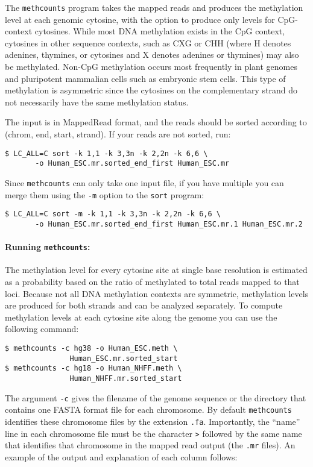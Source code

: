 \documentclass[10pt]{article}
\newcommand{\prog}[1]{\texttt{#1}}
\newcommand{\fn}[1]{\texttt{#1}}
\newcommand{\lit}[1]{\texttt{#1}}
\newcommand{\op}[1]{\texttt{#1}}
\begin{document}
The \prog{methcounts} program takes the mapped reads and produces the
methylation level at each genomic cytosine, with the option to produce
only levels for CpG-context cytosines.
While most DNA methylation exists in the CpG context, cytosines in
other sequence contexts, such as CXG or CHH (where H denotes adenines,
thymines, or cytosines and X denotes adenines or thymines) may also be
methylated. Non-CpG methylation occurs most frequently in plant genomes 
and pluripotent mammalian cells such as embryonic stem cells. This type
of methylation is asymmetric since the cytosines on the complementary 
strand do not necessarily have the same methylation status.

The input is in MappedRead format, and the reads should be sorted
according to (chrom, end, start, strand). If your reads are not
sorted, run:
\begin{verbatim}
$ LC_ALL=C sort -k 1,1 -k 3,3n -k 2,2n -k 6,6 \
       -o Human_ESC.mr.sorted_end_first Human_ESC.mr
\end{verbatim}

Since \prog{methcounts} can only take one input file, if you have
multiple you can merge them using the \op{-m} option to the
\prog{sort} program:

\begin{verbatim}
$ LC_ALL=C sort -m -k 1,1 -k 3,3n -k 2,2n -k 6,6 \
       -o Human_ESC.mr.sorted_end_first Human_ESC.mr.1 Human_ESC.mr.2
\end{verbatim}

\paragraph{Running \prog{methcounts}:}
The methylation level for every cytosine site at single base resolution
is estimated as a probability based on the ratio of methylated to total
reads mapped to that loci. Because not all DNA methylation contexts are
symmetric, methylation levels are produced for both strands and can be
analyzed separately. To compute methylation levels at each
cytosine site along the genome you can use the following command:

\begin{verbatim}
$ methcounts -c hg38 -o Human_ESC.meth \
               Human_ESC.mr.sorted_start
$ methcounts -c hg18 -o Human_NHFF.meth \
               Human_NHFF.mr.sorted_start
\end{verbatim}

The argument \op{-c} gives the filename of the genome sequence or the
directory that contains one FASTA format file for each chromosome. By
default \prog{methcounts} identifies these chromosome files by the
extension \fn{.fa}. Importantly, the ``name'' line in each chromosome
file must be the character \lit{>} followed by the same name that
identifies that chromosome in the mapped read output (the \fn{.mr}
files). An example of the output and explanation of each column follows:
\end{document}
